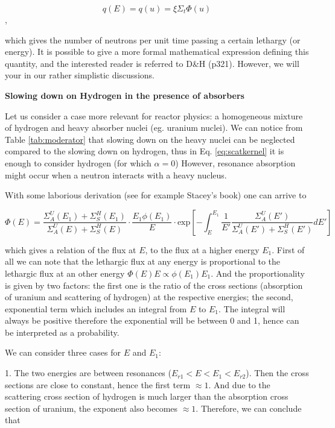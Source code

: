 $$q(E)=q(u)=\xi\Sigma_t\Phi(u)$$,

which gives the number of neutrons per unit time passing a certain lethargy (or energy). It is possible to give a more formal mathematical expression defining this quantity, and the interested reader is referred to D\&H (p321). However, we will your in our rather simplistic discussions.


\vspace{0.5cm}

\textbf{Slowing down on Hydrogen in the presence of absorbers}

Let us consider a case more relevant for reactor physics: a homogeneous mixture of hydrogen and heavy absorber nuclei (eg. uranium nuclei). We can notice from Table \ref{tab:moderator} that slowing down on the heavy nuclei can be neglected compared to the slowing down on hydrogen, thus in Eq. \eqref{eq:scatkernel} it is enough to consider hydrogen (for which $\alpha=0$) However, resonance absorption might occur when a neutron interacts with a heavy nucleus. 

With some laborious derivation (see for example Stacey's book) one can arrive to

\begin{equation}\label{eq:slowingdownHU}
 \Phi(E) = \frac{\Sigma_A^U(E_1) + \Sigma_S^H(E_1)}{ \Sigma_A^U(E) + \Sigma_S^H(E)} \cdot \frac{E_1\phi(E_1)}{E} \cdot \mathrm{exp}\left[-\int_E^{E_1} \frac{1}{E'} \frac{\Sigma_A^U(E')}{\Sigma_A^U(E') + \Sigma_S^H(E')}dE'\right]
\end{equation}

\noindent which gives a relation of the flux at $E$, to the flux at a higher energy $E_1$. First of all we can note that the lethargic flux at any energy is proportional to the lethargic flux at an other energy $\Phi(E)E \propto \phi(E_1)E_1$. And the proportionality is given by two factors: the first one is the ratio of the cross sections (absorption of uranium and scattering of hydrogen) at the respective energies; the second, exponential term which includes an integral from $E$ to $E_1$. The integral will always be positive therefore the exponential will be between 0 and 1, hence can be interpreted as a probability. 

We can consider three cases for $E$ and $E_1$:

1. The two energies are between resonances ($E_{r1}<E<E_1<E_{r2}$). Then the cross sections are close to constant, hence the first term $\approx 1$. And due to the scattering cross section of hydrogen is much larger than the absorption cross section of uranium, the exponent also becomes $\approx 1$. Therefore, we can conclude that  

